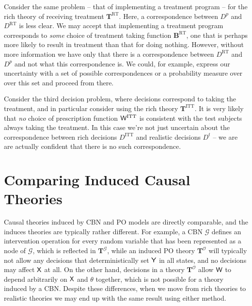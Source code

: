Consider the same problem -- that of implementing a treatment program -- for the rich theory of receiving treatment $\mathbf{T}^{\mathrm{RT}}$. Here, a correspondence between $D^p$ and $D^{\mathrm{RT}}$ is less clear. We may accept that implementing a treatment program corresponds to \emph{some} choice of treatment taking function $\mathbf{B}^{\mathrm{RT}}$, one that is perhaps more likely to result in treatment than that for doing nothing. However, without more information we have only that there is a correspondence between $D^{\mathrm{RT}}$ and $D^p$ and not what this correspondence is. We could, for example, express our uncertainty with a set of possible correspondences or a probability measure over over this set and proceed from there.

Consider the third decision problem, where decisions correspond to taking the treatment, and in particular consider using the rich theory $\mathbf{T}^{\mathrm{ITT}}$. It is very likely that \emph{no} choice of prescription function $\mathsf{W}^{\mathrm{ITT}}$ is consistent with the test subjects always taking the treatment. In this case we're not just uncertain about the correspondence between rich decisions $D^{\mathrm{ITT}}$ and realistic decisions $D^t$ -- we are are actually confident that there is no such correspondence.

\section{Comparing Induced Causal Theories}

Causal theories induced by CBN and PO models are directly comparable, and the induces theories are typically rather different. For example, a CBN $\mathcal{G}$ defines an intervention operation for every random variable that has been represented as a node of $\mathcal{G}$, which is reflected in $\mathbf{T}^\mathcal{G}$, while an induced PO theory $\mathbf{T}^\mathscr{O}$ will typically not allow any decisions that deterministically set $\mathsf{Y}$ in all states, and no decisions may affect $\mathsf{X}$ at all. On the other hand, decisions in a theory $\mathbf{T}^{\mathscr{O}}$ allow $\mathsf{W}$ to depend arbitrarily on $\mathsf{X}$ and $\theta$ together, which is not possible for a theory induced by a CBN. Despite these differences, when we move from rich theories to realistic theories we may end up with the same result using either method.


